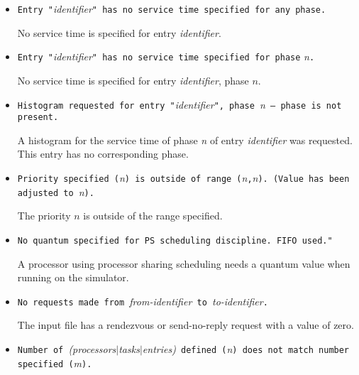 \begin{itemize}
\item \texttt{Entry "}\emph{identifier}\texttt{" has no service time
    specified for any phase.}
  
  No service time is specified for entry
  \emph{identifier}.

\item \texttt{Entry "}\emph{identifier}\texttt{" has no service time
    specified for phase} \emph{n}\texttt{.}
  
  No service time is specified for entry
  \emph{identifier}, phase $n$.

\item \texttt{Histogram requested for entry "}\emph{identifier}\texttt{", phase~}\emph{n}\texttt{ -- phase is not present.}
  
  A histogram for the service time of phase \emph{n} of entry \emph{identifier} was requested.  This entry
  has no corresponding phase.

\item \texttt{Priority specified (}\emph{n}\texttt{) is outside of
    range (}\emph{n}\texttt{,}\emph{n}\texttt{). (Value has been
    adjusted to }\emph{n}\texttt{).}

  The priority $n$ is outside of the range specified.

\item \texttt{No quantum specified for PS scheduling discipline.  FIFO
    used." }
  
  A processor using processor sharing
  scheduling needs a quantum
  value when running on the
  simulator.

\item \texttt{No requests made from }\emph{from-identifier}\texttt{ to
  }\emph{to-identifier}\texttt{.}
  
  The input file has a rendezvous or
  send-no-reply request with a value of
  zero.

\item \texttt{Number of }\emph{(processors$|$tasks$|$entries)}\texttt{
    defined (}\emph{n}\texttt{) does not match number specified
    (}\emph{m}\texttt{).}


\end{itemize}
